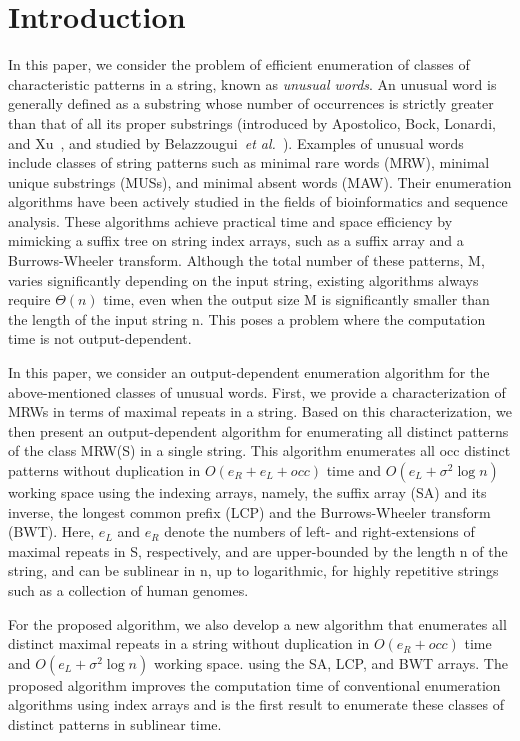 
\section{Introduction}
\label{sec:intro}

In this paper, we consider the problem of efficient enumeration of classes of characteristic patterns in a string, known as \textit{unusual words}. An unusual word is generally defined as a substring whose number of occurrences is strictly greater than that of all its proper substrings (introduced by Apostolico, Bock, Lonardi, and Xu~\cite{apostolico2000efficient}, and studied by Belazzougui~\textit{et al.}~\cite{belazzougui:cunial:gagie:prezza:raffinot2015composite}). Examples of unusual words include classes of string patterns such as minimal rare words (MRW), minimal unique substrings (MUSs), and minimal absent words (MAW). Their enumeration algorithms have been actively studied in the fields of bioinformatics and sequence analysis. These algorithms achieve practical time and space efficiency by mimicking a suffix tree on string index arrays, such as a suffix array and a Burrows-Wheeler transform. Although the total number of these patterns, M, varies significantly depending on the input string, existing algorithms always require $\Theta(n)$ time, even when the output size M is significantly smaller than the length of the input string n. This poses a problem where the computation time is not output-dependent.

In this paper, we consider an output-dependent enumeration algorithm for the above-mentioned classes of unusual words. First, we provide a characterization of MRWs in terms of maximal repeats in a string. Based on this characterization, we then present an output-dependent algorithm for enumerating all distinct patterns of the class MRW(S) in a single string. This algorithm enumerates all occ distinct patterns without duplication
in $O(e_R + e_L + occ)$ time and $O(e_L  + \sigma^2 \log n)$ working space using the indexing arrays, namely, the suffix array (SA) and its inverse, the longest common prefix (LCP) and the Burrows-Wheeler transform (BWT). 
Here, $e_L$ and $e_R$ denote the numbers of left- and right-extensions of maximal repeats in S, respectively, and are upper-bounded by the length n of the string, and can be sublinear in n, up to logarithmic, for highly repetitive strings such as a collection of human genomes.

For the proposed algorithm, we also develop a new algorithm that enumerates all distinct maximal repeats in a string without duplication
in $O(e_R + occ)$ time and $O(e_L + \sigma^2 \log n)$ working space.
using the SA, LCP, and BWT arrays. The proposed algorithm improves the computation time of conventional enumeration algorithms using index arrays and is the first result to enumerate these classes of distinct patterns in sublinear time.

